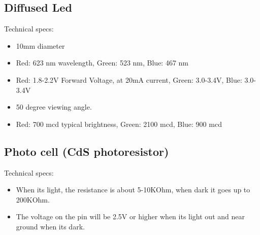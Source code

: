 \documentclass[12pt]{report}
\begin{document}
\begin{appendices}
\subsection*{Diffused Led}
Technical specs:
\begin{itemize}
\item 10mm diameter
\item Red: 623 nm wavelength, Green: 523 nm, Blue: 467 nm
\item Red: 1.8-2.2V Forward Voltage, at 20mA current, Green: 3.0-3.4V, Blue: 3.0-3.4V
\item 50 degree viewing angle.
\item Red: 700 mcd typical brightness, Green: 2100 mcd, Blue: 900 mcd
\end{itemize}
\subsection*{Photo cell (CdS photoresistor)}
Technical specs:
\begin{itemize}
\item When its light, the resistance is about 5-10KOhm, when dark it goes up to 200KOhm.
\item The voltage on the pin will be 2.5V or higher when its light out and near ground when its dark.
\end{itemize}
\end{appendices}
\end{document}
